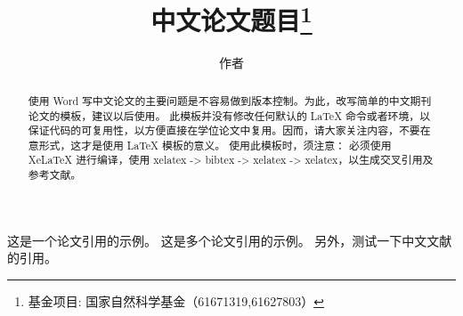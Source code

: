 \documentclass[lang=cn,11pt,a4paper,cite=number, win10]{etpaper}
\title{中文论文题目\footnote{基金项目: 国家自然科学基金（61671319,61627803）}}
\author{作者}
\institute{（天津大学电气自动化与信息工程学院，天津市过程检测与控制重点实验室，天津~300072）}
\date{\zhtoday}
\begin{document}
\maketitle

\begin{abstract}
使用 Word 写中文论文的主要问题是不容易做到版本控制。为此，改写简单的中文期刊论文的模板，建议以后使用。
此模板并没有修改任何默认的 \LaTeX{} 命令或者环境，以保证代码的可复用性，以方便直接在学位论文中复用。因而，请大家关注内容，不要在意形式，这才是使用 \LaTeX{} 模板的意义。
使用此模板时，须注意：
必须使用 {XeLaTeX} 进行编译，使用 xelatex -> bibtex -> xelatex -> xelatex，以生成交叉引用及参考文献。
\end{abstract}
















这是一个论文引用的示例\cite{Cui2011}。
这是多个论文引用的示例\cite{Yang2002,Beck1997,WANG1999}。
另外，测试一下中文文献的引用\cite{Li2006,Zhang2018}。


\end{document}
